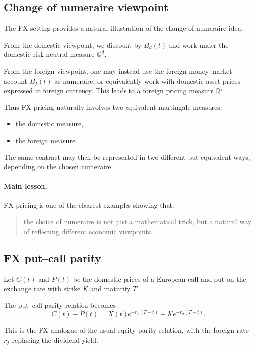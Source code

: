 \documentclass[11pt]{article}
\newcommand{\Qbb}{\mathbb{Q}}
\theoremstyle{definition}
\theoremstyle{plain}
\begin{document}
\subsection{Change of numeraire viewpoint}

The FX setting provides a natural illustration of the change of
numeraire idea.

From the domestic viewpoint, we discount by \(B_d(t)\) and work under
the domestic risk-neutral measure \(\Qbb^d\).

From the foreign viewpoint, one may instead use the foreign money market
account \(B_f(t)\) as numeraire, or equivalently work with domestic
asset prices expressed in foreign currency.
This leads to a foreign pricing measure \(\Qbb^f\).

Thus FX pricing naturally involves two equivalent martingale measures:
\begin{itemize}[leftmargin=1.4em]
\item the domestic measure,
\item the foreign measure.
\end{itemize}

The same contract may then be represented in two different but
equivalent ways, depending on the chosen numeraire.

\paragraph{Main lesson.}
FX pricing is one of the clearest examples showing that:
\begin{quote}
the choice of numeraire is not just a mathematical trick, but a natural
way of reflecting different economic viewpoints.
\end{quote}

\subsection{FX put--call parity}

Let \(C(t)\) and \(P(t)\) be the domestic prices of a European call and
put on the exchange rate with strike \(K\) and maturity \(T\).

The put--call parity relation becomes
\[
\boxed{
C(t)-P(t)=X(t)e^{-r_f(T-t)}-Ke^{-r_d(T-t)}.
}
\]

This is the FX analogue of the usual equity parity relation, with the
foreign rate \(r_f\) replacing the dividend yield.
\end{document}
